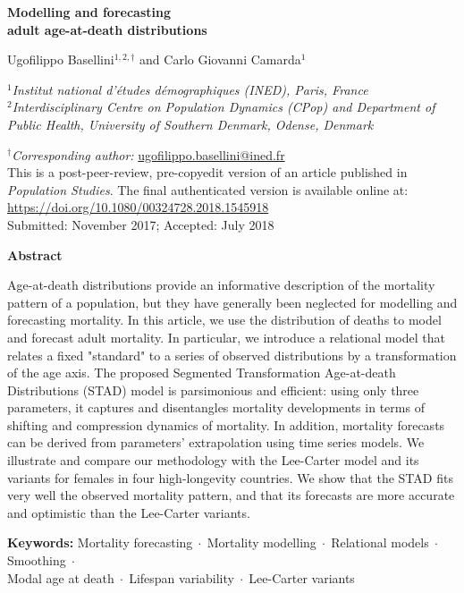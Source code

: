 \documentclass[Thesis]{subfiles}
\begin{document}
\thispagestyle{empty}
{\centering
{\Large\bfseries Modelling and forecasting \\ adult age-at-death distributions \par}
\vspace{0.5cm}
{\large Ugofilippo Basellini$^{1,2,\dagger}$ and Carlo Giovanni Camarda$^{1}$ \par}
\singlespacing
{\normalsize $^{1}$\itshape Institut national d'\'{e}tudes d\'emographiques (INED), Paris, France\\[2mm]}
{\normalsize $^{2}$\itshape Interdisciplinary Centre on Population Dynamics (CPop) and Department of Public Health, University of Southern Denmark, Odense, Denmark\\[2mm]}
{\normalsize $^{\dagger}${\itshape Corresponding author:} \url{ugofilippo.basellini@ined.fr}\\
\vspace{0.5cm} This is a post-peer-review, pre-copyedit version of an article published in \textit{Population Studies}. The final authenticated version is available online at: \url{https://doi.org/10.1080/00324728.2018.1545918} \\  
\vspace{0.5cm} Submitted: November 2017; Accepted: July 2018 \par}
\vspace{1.0cm}
{\bfseries Abstract \\[5mm]}
\onehalfspacing
{\normalsize \justify Age-at-death distributions provide an informative description of the mortality pattern of a population, but they have generally been neglected for modelling and forecasting mortality. In this article, we use the distribution of deaths to model and forecast adult mortality. In particular, we introduce a relational model that relates a fixed "standard" to a series of observed distributions by a transformation of the age axis. The proposed Segmented Transformation Age-at-death Distributions (STAD) model is parsimonious and efficient: using only three parameters, it captures and disentangles mortality developments in terms of shifting and compression dynamics of mortality. In addition, mortality forecasts can be derived from parameters' extrapolation using time series models. We illustrate and compare our methodology with the Lee-Carter model and its variants for females in four high-longevity countries. We show that the STAD fits very well the observed mortality pattern, and that its forecasts are more accurate and optimistic than the Lee-Carter variants.  \par 
\vspace{0.5cm}	
\noindent \textbf{Keywords:} Mortality forecasting$\;\cdot\;$Mortality modelling$\;\cdot\;$Relational models$\;\cdot\;$Smoothing$\;\cdot\;$\\Modal age at death$\;\cdot\;$Lifespan variability$\;\cdot\;$Lee-Carter variants}	
}
\end{document}
